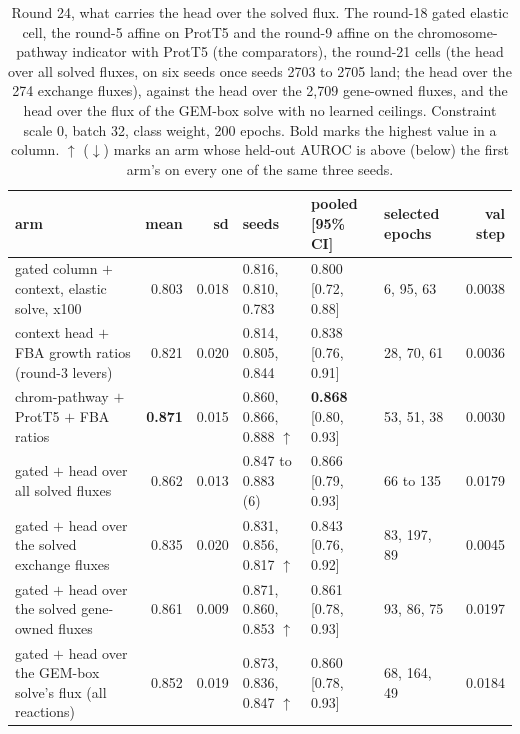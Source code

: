 \begin{table}[H]
  \centering
  \scriptsize
  \caption[Round 24, what carries the head over the solved flux]{Round 24, what carries the head over the solved flux. The round-18 gated elastic cell, the round-5 affine on ProtT5 and the round-9 affine on the chromosome-pathway indicator with ProtT5 (the comparators), the round-21 cells (the head over all solved fluxes, on six seeds once seeds 2703 to 2705 land; the head over the 274 exchange fluxes), against the head over the 2,709 gene-owned fluxes, and the head over the flux of the GEM-box solve with no learned ceilings. Constraint scale 0, batch 32, class weight, 200 epochs. Bold marks the highest value in a column. $\uparrow$ ($\downarrow$) marks an arm whose held-out AUROC is above (below) the first arm's on every one of the same three seeds.}
  \label{tab:w40}
  \begin{tabular}{@{}lrrlllr@{}}
    \hline
    arm & mean & sd & seeds & pooled [95\% CI] & selected epochs & val step \\
    \hline
    gated column $+$ context, elastic solve, x100 & 0.803 & 0.018 & 0.816, 0.810, 0.783 & 0.800 [0.72, 0.88] & 6, 95, 63 & 0.0038 \\
    context head $+$ FBA growth ratios (round-3 levers) & 0.821 & 0.020 & 0.814, 0.805, 0.844 & 0.838 [0.76, 0.91] & 28, 70, 61 & 0.0036 \\
    chrom-pathway $+$ ProtT5 $+$ FBA ratios & \textbf{0.871} & 0.015 & 0.860, 0.866, 0.888 $\uparrow$ & \textbf{0.868} [0.80, 0.93] & 53, 51, 38 & 0.0030 \\
    gated $+$ head over all solved fluxes & 0.862 & 0.013 & 0.847 to 0.883 (6) & 0.866 [0.79, 0.93] & 66 to 135 & 0.0179 \\
    gated $+$ head over the solved exchange fluxes & 0.835 & 0.020 & 0.831, 0.856, 0.817 $\uparrow$ & 0.843 [0.76, 0.92] & 83, 197, 89 & 0.0045 \\
    gated $+$ head over the solved gene-owned fluxes & 0.861 & 0.009 & 0.871, 0.860, 0.853 $\uparrow$ & 0.861 [0.78, 0.93] & 93, 86, 75 & 0.0197 \\
    gated $+$ head over the GEM-box solve's flux (all reactions) & 0.852 & 0.019 & 0.873, 0.836, 0.847 $\uparrow$ & 0.860 [0.78, 0.93] & 68, 164, 49 & 0.0184 \\
    \hline
  \end{tabular}
\end{table}
